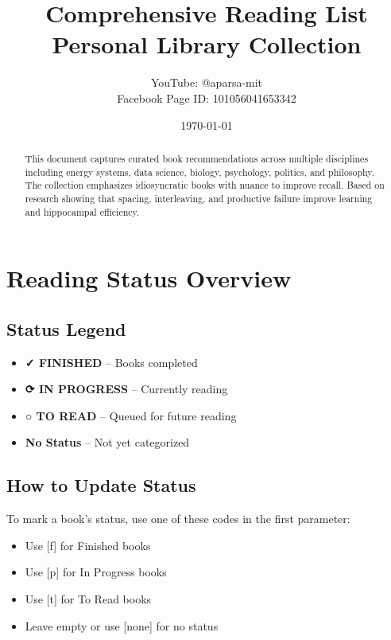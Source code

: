 \documentclass[11pt,a4paper]{article}
\title{\Huge\textbf{Comprehensive Reading List} \\ \Large Personal Library Collection}
\author{YouTube: @aparsa-mit \\ Facebook Page ID: 101056041653342}
\date{\today}
\begin{document}
\maketitle
\thispagestyle{fancy}

\begin{abstract}
\noindent This document captures curated book recommendations across multiple disciplines including energy systems, data science, biology, psychology, politics, and philosophy. The collection emphasizes idiosyncratic books with nuance to improve recall. Based on research showing that spacing, interleaving, and productive failure improve learning and hippocampal efficiency.
\end{abstract}

\tableofcontents
\newpage

\section{Reading Status Overview}

\subsection{Status Legend}
\begin{itemize}[leftmargin=2cm]
  \item \colorbox{finishedbg}{\textcolor{finishedcolor}{\textbf{✓ FINISHED}}} -- Books completed
  \item \colorbox{inprogressbg}{\textcolor{inprogresscolor}{\textbf{⟳ IN PROGRESS}}} -- Currently reading
  \item \colorbox{toreadbg}{\textcolor{toreadcolor}{\textbf{○ TO READ}}} -- Queued for future reading
  \item \textbf{No Status} -- Not yet categorized
\end{itemize}

\subsection{How to Update Status}

To mark a book's status, use one of these codes in the first parameter:
\begin{itemize}
  \item Use [f] for Finished books
  \item Use [p] for In Progress books
  \item Use [t] for To Read books
  \item Leave empty or use [none] for no status
\end{itemize}
\end{document}

